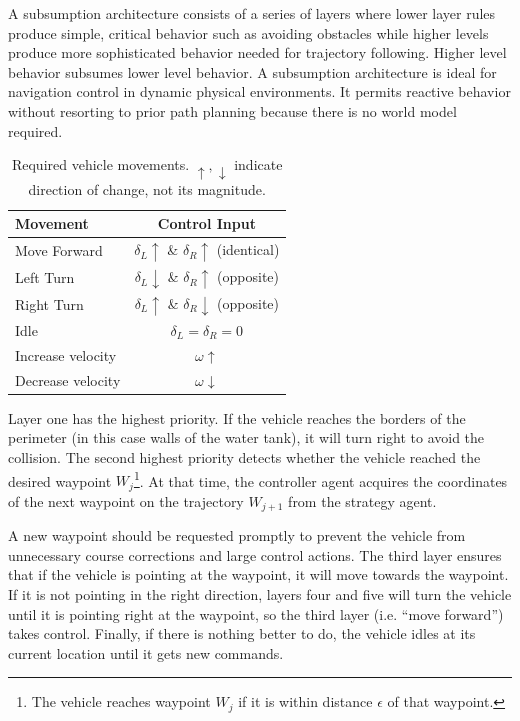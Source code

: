 A subsumption architecture consists of a series of layers where lower layer rules produce simple, critical behavior such as avoiding obstacles while higher levels produce more sophisticated behavior needed for trajectory following. Higher level behavior subsumes lower level behavior. A subsumption architecture is ideal for navigation control in dynamic physical environments. It permits reactive behavior without resorting to prior path planning because there is no world model required.

\begin{table}
\centering
\renewcommand{\arraystretch}{1.7}
\begin{tabular}{>{\small}l>{\small}c}
\hline
Movement & Control Input\\
\hline
\rowcolor{Gray}
Move Forward & $\delta_L \uparrow $ \& $ \delta_R \uparrow$ (identical)\\
Left Turn & $\delta_L  \downarrow $ \& $ \delta_R  \uparrow$ (opposite)\\
\rowcolor{Gray}
Right Turn & $\delta_L \uparrow $ \& $ \delta_R  \downarrow$ (opposite)\\
Idle & $\delta_L = \delta_R = 0$\\
\rowcolor{Gray}
Increase velocity & $\omega \uparrow$\\
Decrease velocity & $\omega \downarrow$\\
\hline
\end{tabular}
\newline
\caption[Required vehicle movements]{Required vehicle movements. $\uparrow, \downarrow$ indicate direction of change, not its magnitude.}
\label{tab-cmd}
\end{table}

Layer one has the highest priority. If the vehicle reaches the borders of the perimeter (in this case walls of the water tank), it will turn right to avoid the collision. The second highest priority detects whether the vehicle reached the desired waypoint $W_j$\footnote{The vehicle reaches waypoint $W_j$ if it is within distance $\epsilon$ of that waypoint.}. At that time, the controller agent acquires the coordinates of the next waypoint on the trajectory $W_{j+1}$ from the strategy agent.

A new waypoint should be requested promptly to prevent the vehicle from unnecessary course corrections and large control actions. The third layer ensures that if the vehicle is pointing at the waypoint, it will move towards the waypoint. If it is not pointing in the right direction, layers four and five will turn the vehicle until it is pointing right at the waypoint, so the third layer (i.e. ``move forward'') takes control. Finally, if there is nothing better to do, the vehicle idles at its current location until it gets new commands.

